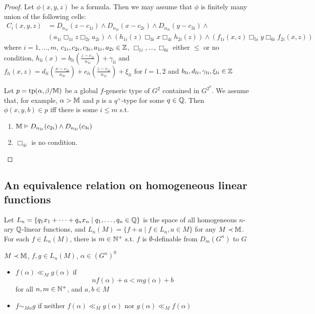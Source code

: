 \documentclass[11pt]{article}
\begin{document}
\begin{proof}
Let \(\phi(x,y,z)\) be a formula. Then we may assume that \(\phi\) is finitely many union of the following
cells:
\begin{align*}
C_i(x,y,z)&=D_{n_{1i}}(z-c_{1i})\wedge D_{n_{2i}}(x-c_{2i})\wedge D_{n_{3i}}(y-c_{3i})\wedge\\
&(a_{1i}\Box_{1i}z\Box_{2i}a_{2i})\wedge(h_{1i}(z)\Box_{3i}x\Box_{4i}h_{2i}(z))\wedge(f_{1i}(x,z)\Box_{5i}y\Box_{6i}f_{2i}(x,z))
\end{align*}
where \(i=1,\dots,m\), \(c_{1i},c_{2i},c_{3i},a_{1i},a_{2i}\in\mathbb{Z}\), \(\Box_{1i},\dots,\Box_{6i}\) either \(\le\) or
no condition, \(h_{li}(x)=b_{li}(\frac{z-c_{1i}}{n_{1i}})+\gamma_{li}\)
and \(f_{li}(x,z)=d_{li}(\frac{x-c_{2i}}{n_{2i}})+e_{li}(\frac{z-c_{1i}}{n_{1i}})+\xi_{li}\)
for \(l=1,2\) and \(b_{li},d_{li},\gamma_{li},\xi_{li}\in\mathbb{Z}\)

Let \(p=\operatorname{tp}(\alpha,\beta/\mathbb{M})\) be a global \(f\)-generic type of \(G^2\) contained in \(G^{2^0}\). We assume
that, for example, \(\alpha>\mathbb{M}\) and \(p\) is a \(q^+\)-type for some \(q\in\mathbb{Q}\). Then \(\phi(x,y,b)\in p\) iff
there is some \(i\le m\) s.t.
\begin{enumerate}
\item \(\mathbb{M}\vDash D_{n_{2i}}(c_{2i})\wedge D_{n_{2i}}(c_{3i})\)
\item \(\Box_{4i}\) is no condition.
\end{enumerate}
\end{proof}

\subsection{An equivalence relation on homogeneous linear functions}
\label{sec:orgbde4999}
Let \(L_n=\{q_1x_1+\dots+q_nx_n\mid q_1,\dots,q_n\in\mathbb{Q}\}\) is the space of all
homogeneous \(n\)-ary \(\mathbb{Q}\)-linear functions, and \(L_n(M)=\{f+a\mid f\in L_n,a\in M\}\) for
any \(M\prec\mathbb{M}\). For each \(f\in L_n(M)\), there is \(m\in\mathbb{N}^+\) s.t. \(f\)
is \(\emptyset\)-definable from \(D_m(G^n)\) to \(G\) \label{Problem6}

\begin{definition}[]
\(M\prec\mathbb{M}\), \(f,g\in L_n(M)\), \(\alpha\in(G^n)^0\)
\begin{itemize}
\item \(f(\alpha)\ll_Mg(\alpha)\) if
\begin{equation*}
nf(\alpha)+a<mg(\alpha)+b
\end{equation*}
for all \(n,m\in\mathbb{N}^+\), and \(a,b\in M\)
\item \(f\sim_{M\alpha}g\) if neither \(f(\alpha)\ll_Mg(\alpha)\) nor \(g(\alpha)\ll_Mf(\alpha)\)
\end{itemize}
\end{definition}
\end{document}
